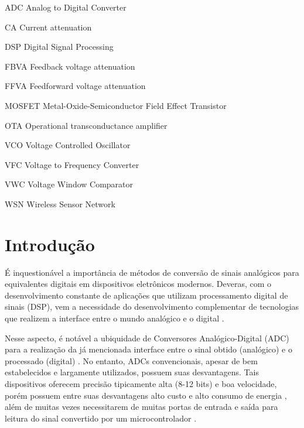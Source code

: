 \documentclass[
	12pt,				%
	oneside,			%
	a4paper,			%
	english,			%
	french,				%
	spanish,			%
	brazil				%
	]{abntex2}
\begin{document}
\begin{siglas}
  \item[ADC] Analog to Digital Converter
  \item[CA] Current attenuation
  \item[DSP] Digital Signal Processing
  \item[FBVA] Feedback voltage attenuation
  \item[FFVA] Feedforward voltage attenuation
  \item[MOSFET] Metal-Oxide-Semiconductor Field Effect Transistor
  \item[OTA] Operational transconductance amplifier
  \item[VCO] Voltage Controlled Oscillator
  \item[VFC] Voltage to Frequency Converter
  \item[VWC] Voltage Window Comparator
  \item[WSN] Wireless Sensor Network

  
\end{siglas}

\tableofcontents*
\clearpage

\textual

\chapter{Introdução}

É inquestionável a importância de métodos de conversão de sinais analógicos para equivalentes digitais em dispositivos eletrônicos modernos. Deveras, com o desenvolvimento constante de aplicações que utilizam processamento digital de sinais (DSP), vem a necessidade do desenvolvimento complementar de tecnologias que realizem a interface entre o mundo analógico e o digital \cite{demler2012high}.      

Nesse aspecto, é notável a ubiquidade de Conversores Analógico-Digital (ADC) para a realização da já mencionada interface entre o sinal obtido (analógico) e o processado (digital) \cite{walden1999}. No entanto, ADCs convencionais, apesar de bem estabelecidos e largamente utilizados, possuem suas desvantagens. Tais dispositivos oferecem precisão tipicamente alta (8-12 bits) e boa velocidade, porém possuem entre suas desvantagens alto custo e alto consumo de energia \cite{singh2009}, além de muitas vezes necessitarem de muitas portas de entrada e saída para leitura do sinal convertido por um microcontrolador \cite{VFCbook}. 
\end{document}

